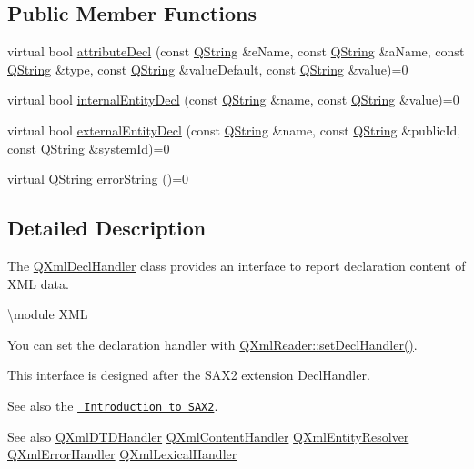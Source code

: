 \subsection*{Public Member Functions}
\begin{DoxyCompactItemize}
\item 
virtual bool \mbox{\hyperlink{class_q_xml_decl_handler_a199291017634d148a72812cb40de2043}{attribute\+Decl}} (const \mbox{\hyperlink{class_q_string}{Q\+String}} \&e\+Name, const \mbox{\hyperlink{class_q_string}{Q\+String}} \&a\+Name, const \mbox{\hyperlink{class_q_string}{Q\+String}} \&type, const \mbox{\hyperlink{class_q_string}{Q\+String}} \&value\+Default, const \mbox{\hyperlink{class_q_string}{Q\+String}} \&value)=0
\item 
virtual bool \mbox{\hyperlink{class_q_xml_decl_handler_ae54a0fbdcd4314143bf556ce5bfac597}{internal\+Entity\+Decl}} (const \mbox{\hyperlink{class_q_string}{Q\+String}} \&name, const \mbox{\hyperlink{class_q_string}{Q\+String}} \&value)=0
\item 
virtual bool \mbox{\hyperlink{class_q_xml_decl_handler_ae12d792c249eb6f92c54b2e1734fd60f}{external\+Entity\+Decl}} (const \mbox{\hyperlink{class_q_string}{Q\+String}} \&name, const \mbox{\hyperlink{class_q_string}{Q\+String}} \&public\+Id, const \mbox{\hyperlink{class_q_string}{Q\+String}} \&system\+Id)=0
\item 
virtual \mbox{\hyperlink{class_q_string}{Q\+String}} \mbox{\hyperlink{class_q_xml_decl_handler_a92d52f5e57b8041a956c30b92dd28161}{error\+String}} ()=0
\end{DoxyCompactItemize}


\subsection{Detailed Description}
The \mbox{\hyperlink{class_q_xml_decl_handler}{Q\+Xml\+Decl\+Handler}} class provides an interface to report declaration content of X\+ML data. 

\textbackslash{}module X\+ML

You can set the declaration handler with \mbox{\hyperlink{class_q_xml_reader_a6d16a9420620f829cacb2cdb256d80a7}{Q\+Xml\+Reader\+::set\+Decl\+Handler()}}.

This interface is designed after the S\+A\+X2 extension Decl\+Handler.

See also the \href{xml.html\#introSAX2}{\texttt{ Introduction to S\+A\+X2}}.

\begin{DoxySeeAlso}{See also}
\mbox{\hyperlink{class_q_xml_d_t_d_handler}{Q\+Xml\+D\+T\+D\+Handler}} \mbox{\hyperlink{class_q_xml_content_handler}{Q\+Xml\+Content\+Handler}} \mbox{\hyperlink{class_q_xml_entity_resolver}{Q\+Xml\+Entity\+Resolver}} \mbox{\hyperlink{class_q_xml_error_handler}{Q\+Xml\+Error\+Handler}} \mbox{\hyperlink{class_q_xml_lexical_handler}{Q\+Xml\+Lexical\+Handler}} 
\end{DoxySeeAlso}



